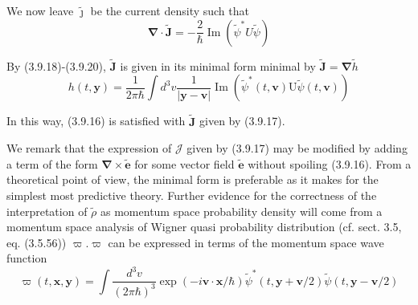 \documentclass{article}
\begin{document}
We now leave $\tilde{\boldsymbol{\jmath}}$ be the current density such that
$$
\begin{equation*}
\boldsymbol{\nabla} \cdot \tilde{\boldsymbol{J}}=-\frac{2}{\hbar} \operatorname{Im}\left(\tilde{\psi}^{*} U \tilde{\psi}\right) \tag{3.9.29}
\end{equation*}
$$

By (3.9.18)-(3.9.20), $\tilde{\boldsymbol{J}}$ is given in its minimal form minimal by $\tilde{\boldsymbol{J}}=\boldsymbol{\nabla} \tilde{h}$
$$
\begin{equation*}
h(t, \boldsymbol{y})=\frac{1}{2 \pi \hbar} \int d^{3} v \frac{1}{|\boldsymbol{y}-\boldsymbol{v}|} \operatorname{Im}\left(\tilde{\psi}^{*}(t, \boldsymbol{v}) \mathrm{U} \tilde{\psi}(t, \boldsymbol{v})\right) \tag{3.9.30}
\end{equation*}
$$

In this way, (3.9.16) is satisfied with $\tilde{\boldsymbol{J}}$ given by (3.9.17).

We remark that the expression of $\boldsymbol{\mathcal { J }}$ given by (3.9.17) may be modified by adding a term of the form $\boldsymbol{\nabla} \times \tilde{\boldsymbol{e}}$ for some vector field $\tilde{\boldsymbol{e}}$ without spoiling (3.9.16). From a theoretical point of view, the minimal form is preferable as it makes for the
simplest most predictive theory.
Further evidence for the correctness of the interpretation of $\tilde{\rho}$ as momentum space probability density will come from a momentum space analysis of Wigner quasi probability distribution (cf. sect. 3.5, eq. (3.5.56)) $\varpi . \varpi$ can be expressed in terms of the momentum space wave function
$$
\begin{equation*}
\varpi(t, \boldsymbol{x}, \boldsymbol{y})=\int \frac{d^{3} v}{(2 \pi \hbar)^{3}} \exp (-i \boldsymbol{v} \cdot \boldsymbol{x} / \hbar) \tilde{\psi}^{*}(t, \boldsymbol{y}+\boldsymbol{v} / 2) \tilde{\psi}(t, \boldsymbol{y}-\boldsymbol{v} / 2) \tag{3.9.31}
\end{equation*}
$$
\end{document}
